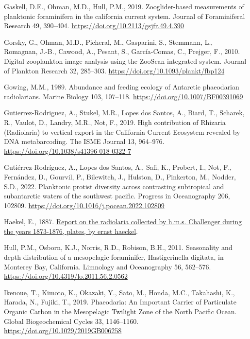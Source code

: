 \documentclass[
]{article}
\newlength{\cslhangindent}
\newenvironment{CSLReferences}[2] %
 {\begin{list}{}{%
  \setlength{\itemindent}{0pt}
  \setlength{\leftmargin}{0pt}
  \setlength{\parsep}{0pt}
  \ifodd #1
   \setlength{\leftmargin}{\cslhangindent}
   \setlength{\itemindent}{-1\cslhangindent}
  \fi
  \setlength{\itemsep}{#2\baselineskip}}}
 {\end{list}}
\begin{document}
\begin{CSLReferences}{1}{0}
Gaskell, D.E., Ohman, M.D., Hull, P.M., 2019. Zooglider-based
measurements of planktonic foraminifera in the california current
system. Journal of Foraminiferal Research 49, 390--404.
\url{https://doi.org/10.2113/gsjfr.49.4.390}

Gorsky, G., Ohman, M.D., Picheral, M., Gasparini, S., Stemmann, L.,
Romagnan, J.-B., Cawood, A., Pesant, S., García-Comas, C., Prejger, F.,
2010. Digital zooplankton image analysis using the ZooScan integrated
system. Journal of Plankton Research 32, 285--303.
\url{https://doi.org/10.1093/plankt/fbp124}

Gowing, M.M., 1989. Abundance and feeding ecology of Antarctic
phaeodarian radiolarians. Marine Biology 103, 107--118.
\url{https://doi.org/10.1007/BF00391069}

Gutierrez-Rodriguez, A., Stukel, M.R., Lopes dos Santos, A., Biard, T.,
Scharek, R., Vaulot, D., Landry, M.R., Not, F., 2019. High contribution
of Rhizaria (Radiolaria) to vertical export in the California Current
Ecosystem revealed by DNA metabarcoding. The ISME Journal 13, 964--976.
\url{https://doi.org/10.1038/s41396-018-0322-7}

Gutiérrez-Rodríguez, A., Lopes dos Santos, A., Safi, K., Probert, I.,
Not, F., Fernández, D., Gourvil, P., Bilewitch, J., Hulston, D.,
Pinkerton, M., Nodder, S.D., 2022. Planktonic protist diversity across
contrasting subtropical and subantarctic waters of the southwest
pacific. Progress in Oceanography 206, 102809.
\url{https://doi.org/10.1016/j.pocean.2022.102809}

Haekel, E., 1887.
\href{https://www.gutenberg.org/cache/epub/44527/pg44527-images.html}{Report
on the radiolaria collected by h.m.s. Challenger during the years
1873-1876, plates, by ernst haeckel}.

Hull, P.M., Osborn, K.J., Norris, R.D., Robison, B.H., 2011. Seasonality
and depth distribution of a mesopelagic foraminifer, Hastigerinella
digitata, in Monterey Bay, California. Limnology and Oceanography 56,
562--576. \url{https://doi.org/10.4319/lo.2011.56.2.0562}

Ikenoue, T., Kimoto, K., Okazaki, Y., Sato, M., Honda, M.C., Takahashi,
K., Harada, N., Fujiki, T., 2019. Phaeodaria: An Important Carrier of
Particulate Organic Carbon in the Mesopelagic Twilight Zone of the North
Pacific Ocean. Global Biogeochemical Cycles 33, 1146--1160.
\url{https://doi.org/10.1029/2019GB006258}


\end{CSLReferences}
\end{document}

